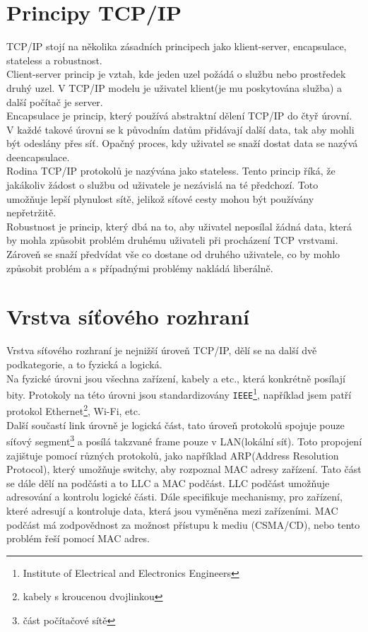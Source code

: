 \documentclass[12pt]{report}			%
\begin{document}
			\section{Principy TCP/IP}
			TCP/IP stojí na několika zásadních principech jako klient-server, encapsulace, stateless a robustnost. 
\\
Client-server princip je vztah, kde jeden uzel požádá o službu nebo
 prostředek druhý uzel. V TCP/IP modelu je uživatel klient(je mu poskytována služba) a další počítač je server. 
\\
Encapsulace je princip, který používá abstraktní dělení TCP/IP do čtyř úrovní. V každé takové úrovni se k původním datům přidávají další data, tak aby mohli být odeslány přes síť. Opačný proces, kdy uživatel se snaží dostat data se nazývá deencapsulace.
\\
Rodina TCP/IP protokolů je nazývána jako stateless. Tento princip říká, že jakákoliv žádost o službu od uživatele je nezávislá na té předchozí. Toto umožňuje lepší plynulost sítě, jelikož síťové cesty mohou být používány nepřetržitě.
\\
Robustnost je princip, který dbá na to, aby uživatel neposílal žádná data, která by mohla způsobit problém druhému uživateli při procházení TCP vrstvami. Zároveň se snaží předvídat vše co dostane od druhého uživatele, co by mohlo způsobit problém a s případnými problémy nakládá liberálně.\cite{Princip1}  \cite{zakladykomunikace1}  \cite{Princip3}  \cite{Princip4}  \cite{Princip5}  \cite{Princip6}
			
			
			\section{Vrstva síťového rozhraní}
			Vrstva síťového rozhraní je nejnižší úroveň TCP/IP, dělí se na další dvě podkategorie, a to fyzická a logická.
\\
Na fyzické úrovni jsou všechna zařízení, kabely a etc., která konkrétně posílají bity. Protokoly na této úrovni jsou standardizovány \texttt{IEEE}\footnote{Institute of Electrical and Electronics Engineers}, například jsem patří protokol Ethernet\footnote{kabely s kroucenou dvojlinkou}, Wi-Fi, etc.
 \\
Další součastí link úrovně je logická část, tato úroveň protokolů spojuje pouze síťový segment\footnote{část počítačové sítě} a posílá takzvané frame pouze v LAN(lokální síť). Toto propojení zajištuje pomocí různých protokolů, jako například ARP(Address Resolution Protocol), který umožňuje switchy, aby rozpoznal MAC adresy zařízení. Tato část se dále dělí na podčásti a to LLC a MAC podčást. LLC podčást umožňuje adresování a kontrolu logické části. Dále specifikuje mechanismy, pro zařízení, které adresují a kontroluje data, která jsou vyměněna mezi zařízeními. MAC podčást má zodpovědnost za možnost přístupu k mediu (CSMA/CD), nebo tento problém řeší pomocí MAC adres. \cite{Princip5} \cite{Link2} \cite{Link3} \cite{Link4} \cite{Link5} \cite{Link6}
\end{document}
